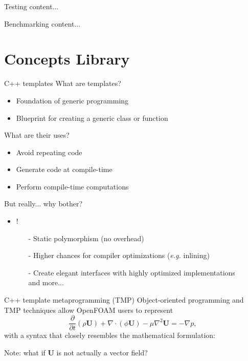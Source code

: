 \documentclass{beamer}
\begin{document}
\begin{frame}{Testing}
	content...
\end{frame}

\begin{frame}{Benchmarking}
	content...
\end{frame}

\section{Concepts Library}

\begin{frame}{C++ templates}
	What are templates?
	\begin{itemize}
		\item Foundation of generic programming
		\item Blueprint for creating a generic class or function
	\end{itemize}
	
	What are their uses?
	\begin{itemize}
		\item Avoid repeating code
		\item Generate code at compile-time
		\item Perform compile-time computations
	\end{itemize}

	But really... why bother?
	\begin{itemize}
		\item {}!
		\begin{itemize}
			\item[-] Static polymorphism (no overhead)
			\item[-] Higher chances for compiler optimizations (\textit{e.g.} inlining)
			\item[-] Create elegant interfaces with highly optimized implementations\\
			\vspace{5pt}
			and more...
		\end{itemize}
	\end{itemize}
\end{frame}

\begin{frame}{C++ template metaprogramming (TMP)}
	Object-oriented programming and TMP techniques allow OpenFOAM users to represent
	\begin{equation}
		\frac{\partial}{\partial t}\left(\rho\mathbf{U}\right) + \nabla\cdot\left(\phi\mathbf{U}\right) - \mu\nabla^2\mathbf{U} = -\nabla p,
	\end{equation}
	with a syntax that closely resembles the mathematical formulation:
	
	Note: what if $\mathbf{U}$ is not actually a vector field?
\end{frame}
\end{document}
